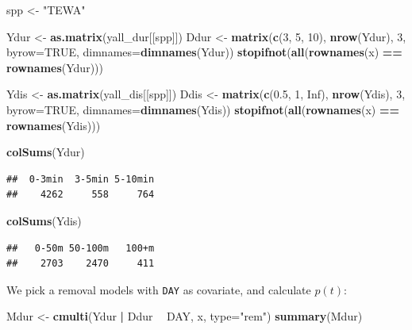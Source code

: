 \documentclass[12pt,]{book}
\newenvironment{Shaded}{\begin{snugshade}}{\end{snugshade}}
\newcommand{\DataTypeTok}[1]{\textcolor[rgb]{0.13,0.29,0.53}{#1}}
\newcommand{\DecValTok}[1]{\textcolor[rgb]{0.00,0.00,0.81}{#1}}
\newcommand{\FloatTok}[1]{\textcolor[rgb]{0.00,0.00,0.81}{#1}}
\newcommand{\KeywordTok}[1]{\textcolor[rgb]{0.13,0.29,0.53}{\textbf{#1}}}
\newcommand{\NormalTok}[1]{#1}
\newcommand{\OperatorTok}[1]{\textcolor[rgb]{0.81,0.36,0.00}{\textbf{#1}}}
\newcommand{\OtherTok}[1]{\textcolor[rgb]{0.56,0.35,0.01}{#1}}
\newcommand{\StringTok}[1]{\textcolor[rgb]{0.31,0.60,0.02}{#1}}
\begin{document}
\begin{Shaded}
\begin{Highlighting}[]
\NormalTok{spp <-}\StringTok{ "TEWA"}

\NormalTok{Ydur <-}\StringTok{ }\KeywordTok{as.matrix}\NormalTok{(yall_dur[[spp]])}
\NormalTok{Ddur <-}\StringTok{ }\KeywordTok{matrix}\NormalTok{(}\KeywordTok{c}\NormalTok{(}\DecValTok{3}\NormalTok{, }\DecValTok{5}\NormalTok{, }\DecValTok{10}\NormalTok{), }\KeywordTok{nrow}\NormalTok{(Ydur), }\DecValTok{3}\NormalTok{, }\DataTypeTok{byrow=}\OtherTok{TRUE}\NormalTok{,}
  \DataTypeTok{dimnames=}\KeywordTok{dimnames}\NormalTok{(Ydur))}
\KeywordTok{stopifnot}\NormalTok{(}\KeywordTok{all}\NormalTok{(}\KeywordTok{rownames}\NormalTok{(x) }\OperatorTok{==}\StringTok{ }\KeywordTok{rownames}\NormalTok{(Ydur)))}

\NormalTok{Ydis <-}\StringTok{ }\KeywordTok{as.matrix}\NormalTok{(yall_dis[[spp]])}
\NormalTok{Ddis <-}\StringTok{ }\KeywordTok{matrix}\NormalTok{(}\KeywordTok{c}\NormalTok{(}\FloatTok{0.5}\NormalTok{, }\DecValTok{1}\NormalTok{, }\OtherTok{Inf}\NormalTok{), }\KeywordTok{nrow}\NormalTok{(Ydis), }\DecValTok{3}\NormalTok{, }\DataTypeTok{byrow=}\OtherTok{TRUE}\NormalTok{,}
  \DataTypeTok{dimnames=}\KeywordTok{dimnames}\NormalTok{(Ydis))}
\KeywordTok{stopifnot}\NormalTok{(}\KeywordTok{all}\NormalTok{(}\KeywordTok{rownames}\NormalTok{(x) }\OperatorTok{==}\StringTok{ }\KeywordTok{rownames}\NormalTok{(Ydis)))}

\KeywordTok{colSums}\NormalTok{(Ydur)}
\end{Highlighting}
\end{Shaded}

\begin{verbatim}
##  0-3min  3-5min 5-10min 
##    4262     558     764
\end{verbatim}

\begin{Shaded}
\begin{Highlighting}[]
\KeywordTok{colSums}\NormalTok{(Ydis)}
\end{Highlighting}
\end{Shaded}

\begin{verbatim}
##   0-50m 50-100m   100+m 
##    2703    2470     411
\end{verbatim}

We pick a removal models with \texttt{DAY} as covariate,
and calculate \(p(t)\):

\begin{Shaded}
\begin{Highlighting}[]
\NormalTok{Mdur <-}\StringTok{ }\KeywordTok{cmulti}\NormalTok{(Ydur }\OperatorTok{|}\StringTok{ }\NormalTok{Ddur }\OperatorTok{~}\StringTok{ }\NormalTok{DAY, x, }\DataTypeTok{type=}\StringTok{"rem"}\NormalTok{)}
\KeywordTok{summary}\NormalTok{(Mdur)}
\end{Highlighting}
\end{Shaded}
\end{document}
